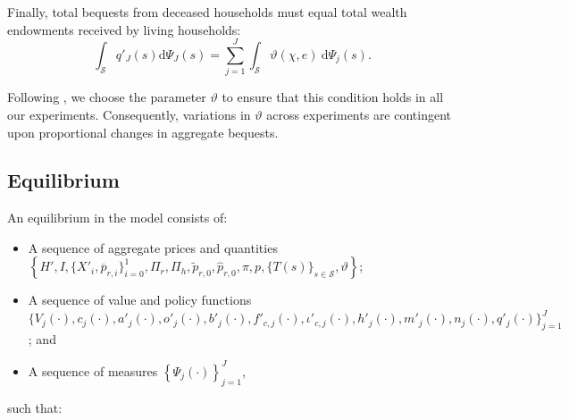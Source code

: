 \documentclass[parskip=full]{article}
\begin{document}
Finally, total bequests from deceased households must equal total wealth endowments received by living households:
\begin{equation}\label{market_clearing:agg_bequests}
    \int_{\mathcal{S}} q'_{J}(s) \mathrm{d}\Psi_{J}(s) = \sum_{j=1}^J \int_{\mathcal{S}} \vartheta (\chi,e)\ \mathrm{d}\Psi_j(s).
\end{equation}

\noindent Following \citet{kkk-2021}, we choose the parameter $\vartheta$ to ensure that this condition holds in all our experiments. Consequently, variations in $\vartheta$ across experiments are contingent upon proportional changes in aggregate bequests.

\subsection{Equilibrium}
An equilibrium in the model consists of: 
\begin{itemize}
    \item A sequence of aggregate prices and quantities
    $\left\{H',I,\{X'_{i}, \overline{p}_{r,i} \}^{1}_{i=0},\Pi_r,\Pi_h,\tilde{p}_{r,0},\hat{p}_{r,0},\pi,p,\{T(s)\}_{s \in \mathcal{S}},\vartheta\right\}$;
    \item A sequence of value and policy functions
    $\biggl\{V_{j}(\cdot),c_{j}(\cdot),a'_{j}(\cdot),o'_{j}(\cdot),b'_{j}(\cdot),f'_{c,j}(\cdot),\iota'_{c,j}(\cdot),h'_{j}(\cdot),m'_{j}(\cdot),n_{j}(\cdot),q'_{j}(\cdot)\biggl\}_{j=1}^J$; and
    \item A sequence of measures 
     $\left\{\Psi_{j}(\cdot)\right\}_{j=1}^J$,
\end{itemize}
\noindent such that:
\end{document}
